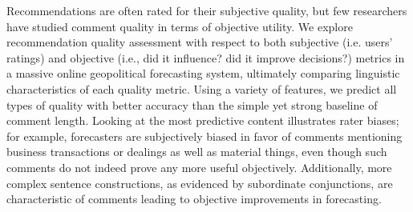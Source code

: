 Recommendations are often rated for their subjective quality, but few researchers have studied comment quality in terms of objective utility. We explore recommendation quality assessment with respect to both subjective (i.e. users' ratings) and objective (i.e., did it influence? did it improve decisions?) metrics in a massive online geopolitical forecasting system, ultimately comparing linguistic characteristics of each quality metric. Using a variety of features, we predict all types of quality with better accuracy than the simple yet strong baseline of comment length. Looking at the most predictive content illustrates rater biases; for example, forecasters are subjectively biased in favor of comments mentioning business transactions or dealings as well as material things, even though such comments do not indeed prove any more useful objectively. Additionally, more complex sentence constructions, as evidenced by subordinate conjunctions, are characteristic of comments leading to objective improvements in forecasting.
